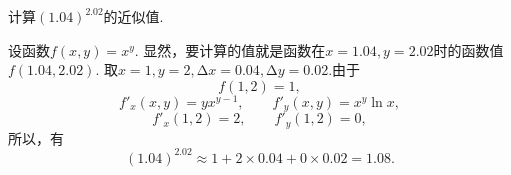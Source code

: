 \begin{example}
计算\((1.04)^{2.02}\)的近似值.
\begin{solution}
设函数\(f(x,y) = x^y\).
显然，要计算的值就是函数在\(x=1.04,y=2.02\)时的函数值\(f(1.04,2.02)\).
取\(x=1,y=2,\increment x=0.04,\increment y=0.02\).由于\[
	f(1,2)=1,
\]\[
	f'_x(x,y) = y x^{y-1}, \qquad f'_y(x,y) = x^y \ln x,
\]\[
	f'_x(1,2) = 2, \qquad f'_y(1,2) = 0,
\]
所以，有\[
	(1.04)^{2.02} \approx 1 + 2 \times 0.04 + 0 \times 0.02 = 1.08.
\]
\end{solution}
\end{example}
